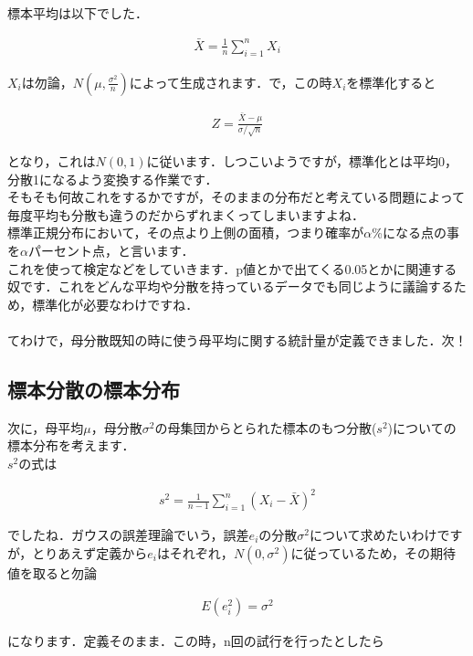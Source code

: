 \documentclass[11pt,a4paper,uplatex]{ujreport} 	%
\begin{document}
標本平均は以下でした．

\begin{align}
  \bar{X} = \frac{1}{n}\sum_{i=1}^n X_i
\end{align}

$X_i$は勿論，$N(\mu, \frac{\sigma^2}{n})$によって生成されます．で，この時$X_i$を標準化すると

\begin{align}
  Z = \frac{\bar{X}-\mu}{\sigma/\sqrt{n}}
  \label{eq:z}
\end{align}

となり，これは$N(0,1)$に従います．しつこいようですが，標準化とは平均0，分散1になるよう変換する作業です．\\

そもそも何故これをするかですが，そのままの分布だと考えている問題によって毎度平均も分散も違うのだからずれまくってしまいますよね．\\

標準正規分布において，その点より上側の面積，つまり確率が$\alpha$\%になる点の事を$\alpha$パーセント点，と言います．\\

これを使って検定などをしていきます．p値とかで出てくる0.05とかに関連する奴です．これをどんな平均や分散を持っているデータでも同じように議論するため，標準化が必要なわけですね．\\
\\

てわけで，母分散既知の時に使う母平均に関する統計量が定義できました．次！
\subsection{標本分散の標本分布}
次に，母平均$\mu$，母分散$\sigma^2$の母集団からとられた標本のもつ分散($s^2$)についての標本分布を考えます．\\

$s^2$の式は

\begin{align}
  s^2 = \frac{1}{n-1}\sum_{i=1}^n (X_i - \bar{X})^2
\end{align}

でしたね．ガウスの誤差理論でいう，誤差$e_i$の分散$\sigma^2$について求めたいわけですが，とりあえず定義から$e_i$はそれぞれ，$N(0,\sigma^2)$に従っているため，その期待値を取ると勿論

\begin{align}
  E(e_i^2) = \sigma^2
\end{align}

になります．定義そのまま．この時，n回の試行を行ったとしたら
\end{document}
